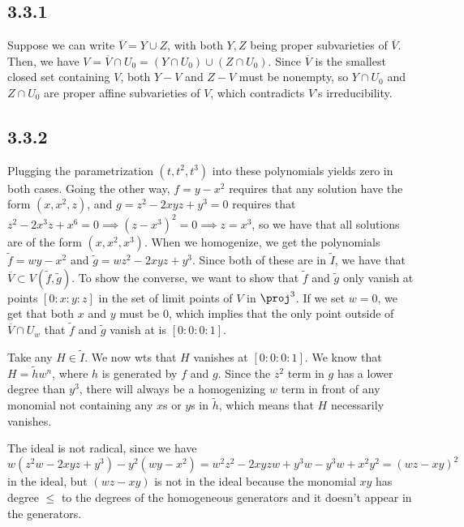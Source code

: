 \documentclass{article}
\newcommand{\conj}{\overline}
\begin{document}
\subsection*{3.3.1}
Suppose we can write $\overline{V}=Y\cup Z$, with both $Y,Z$ being proper subvarieties of $\conj{V}$. Then, we have $V=\conj{V}\cap U_0=(Y\cap U_0)\cup(Z\cap U_0)$. Since $\conj{V}$ is the smallest closed set containing $V$, both $Y-V$ and $Z-V$ must be nonempty, so $Y\cap U_0$ and $Z\cap U_0$ are proper affine subvarieties of $V$, which contradicts $V$'s irreducibility.
\subsection*{3.3.2}
Plugging the parametrization $(t,t^2,t^3)$ into these polynomials yields zero in both cases. Going the other way, $f=y-x^2$ requires that any solution have the form $(x,x^2,z)$, and $g=z^2-2xyz+y^3=0$ requires that $z^2-2x^3z+x^6=0\implies(z-x^3)^2=0\implies z=x^3$, so we have that all solutions are of the form $(x,x^2,x^3)$. When we homogenize, we get the polynomials $\tilde{f}=wy-x^2$ and $\tilde{g}=wz^2-2xyz+y^3$. Since both of these are in $\tilde{I}$, we have that $\conj{V}\subset V(\tilde{f},\tilde{g})$. To show the converse, we want to show that $\tilde{f}$ and $\tilde{g}$ only vanish at points $[0:x:y:z]$ in the set of limit points of $V$ in $\proj^3$. If we set $w=0$, we get that both $x$ and $y$ must be $0$, which implies that the only point outside of $\conj{V}\cap U_w$ that $\tilde{f}$ and $\tilde{g}$ vanish at is $[0:0:0:1]$. 

Take any $H\in\tilde{I}$. We now wts that $H$ vanishes at $[0:0:0:1]$. We know that $H=\tilde{h}w^n$, where $h$ is generated by $f$ and $g$. Since the $z^2$ term in $g$ has a lower degree than $y^3$, there will always be a homogenizing $w$ term in front of any monomial not containing any $x$s or $y$s in $\tilde{h}$, which means that $H$ necessarily vanishes.

The ideal is not radical, since we have $w(z^2w-2xyz+y^3)-y^2(wy-x^2)=w^2z^2-2xyzw+y^3w-y^3w+x^2y^2=(wz-xy)^2$ in the ideal, but $(wz-xy)$ is not in the ideal because the monomial $xy$ has degree $\leq$ to the degrees of the homogeneous generators and it doesn't appear in the generators.
\end{document}
